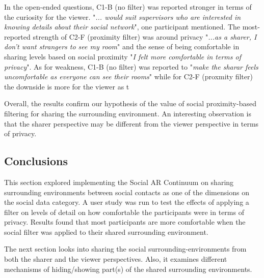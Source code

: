 In the open-ended questions, C1-B (no filter) was reported stronger in terms of the curiosity for the viewer. "\textit{... would suit supervisors who are interested in knowing details about their social network}", one participant mentioned. The most-reported strength of C2-F (proximity filter) was around privacy "\textit{...as a sharer, I don't want strangers to see my room}" and the sense of being comfortable in sharing levels based on social proximity "\textit{I felt more comfortable in terms of privacy}". As for weakness, C1-B (no filter) was reported to "\textit{make the sharar feels uncomfortable as everyone can see their rooms}" while for C2-F (proxmity filter) the downside is more for the viewer as t

Overall, the results confirm our hypothesis of the value of social proximity-based filtering for sharing the surrounding environment. An interesting observation is that the sharer perspective may be different from the viewer perspective in terms of privacy. 


\subsection{Conclusions}

This section explored implementing the Social AR Continuum on sharing surrounding environments between social contacts as one of the dimensions on the social data category. A user study was run to test the effects of applying a filter on levels of detail on how comfortable the participants were in terms of privacy. Results found that most participants are more comfortable when the social filter was applied to their shared surrounding environment.

The next section looks into sharing the social surrounding-environments from both the sharer and the viewer perspectives. Also, it examines different mechanisms of hiding/showing part(s) of the shared surrounding environments. 